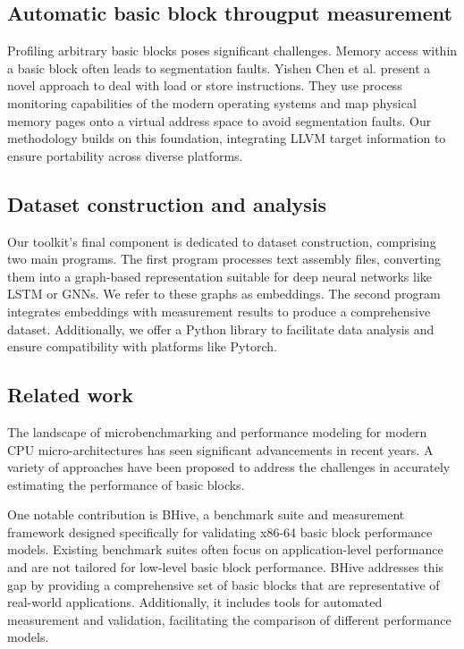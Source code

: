 \subsection{Automatic basic block througput measurement}

Profiling arbitrary basic blocks poses significant challenges. Memory access within a basic block often leads to segmentation faults. Yishen Chen et al. \cite{chenBHiveBenchmarkSuite2019} present a novel approach to deal with load or store instructions. They use process monitoring capabilities of the modern operating systems and map physical memory pages onto a virtual address space to avoid segmentation faults. Our methodology builds on this foundation, integrating LLVM target information to ensure portability across diverse platforms.

\subsection{Dataset construction and analysis}

Our toolkit's final component is dedicated to dataset construction, comprising two main programs. The first program processes text assembly files, converting them into a graph-based representation suitable for deep neural networks like LSTM or GNNs. We refer to these graphs as embeddings. The second program integrates embeddings with measurement results to produce a comprehensive dataset. Additionally, we offer a Python library to facilitate data analysis and ensure compatibility with platforms like Pytorch.

\subsection{Related work}

The landscape of microbenchmarking and performance modeling for modern CPU micro-architectures has seen significant advancements in recent years. A variety of approaches have been proposed to address the challenges in accurately estimating the performance of basic blocks.

One notable contribution is BHive, a benchmark suite and measurement framework designed specifically for validating x86-64 basic block performance models\cite{chenBHiveBenchmarkSuite2019}. Existing benchmark suites often focus on application-level performance and are not tailored for low-level basic block performance. BHive addresses this gap by providing a comprehensive set of basic blocks that are representative of real-world applications. Additionally, it includes tools for automated measurement and validation, facilitating the comparison of different performance models.

